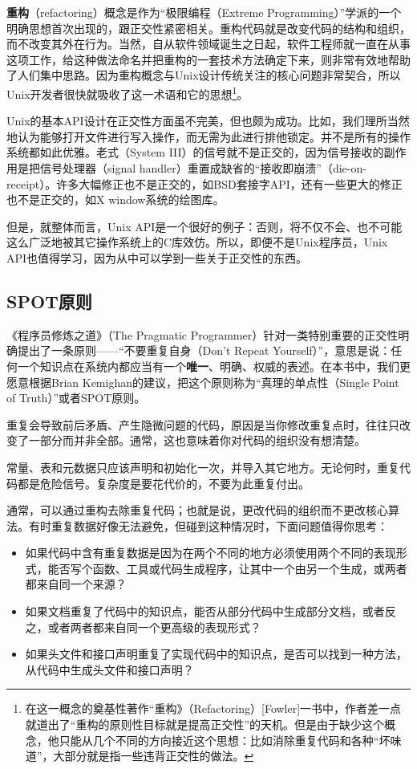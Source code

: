 \documentclass[11pt,oneside]{book}
\begin{document}
\begin{common-format}
\textbf{重构}（refactoring）概念是作为“极限编程（Extreme Programming）”学派的一个明确思想首次出现的，跟正交性紧密相关。重构代码就是改变代码的结构和组织，而不改变其外在行为。当然，自从软件领域诞生之日起，软件工程师就一直在从事这项工作，给这种做法命名并把重构的一套技术方法确定下来，则非常有效地帮助了人们集中思路。因为重构概念与Unix设计传统关注的核心问题非常契合，所以Unix开发者很快就吸收了这一术语和它的思想\footnote{在这一概念的奠基性著作“重构》（Refactoring）[Fowler]一书中，作者差一点就道出了“重构的原则性目标就是提高正交性”的天机。但是由于缺少这个概念，他只能从几个不同的方向接近这个思想：比如消除重复代码和各种“坏味道”，大部分就是指一些违背正交性的做法。}。

Unix的基本API设计在正交性方面虽不完美，但也颇为成功。比如，我们理所当然地认为能够打开文件进行写入操作，而无需为此进行排他锁定。并不是所有的操作系统都如此优雅。老式（System III）的信号就不是正交的，因为信号接收的副作用是把信号处理器（signal handler）重置成缺省的“接收即崩溃”（die-on-receipt）。许多大幅修正也不是正交的，如BSD套接字API，还有一些更大的修正也不是正交的，如X window系统的绘图库。

但是，就整体而言，Unix API是一个很好的例子：否则，将不仅不会、也不可能这么广泛地被其它操作系统上的C库效仿。所以，即便不是Unix程序员，Unix API也值得学习，因为从中可以学到一些关于正交性的东西。


\subsection{SPOT原则}
《程序员修炼之道》（The Pragmatic Programmer）针对一类特别重要的正交性明确提出了一条原则——“不要重复自身（Don't Repeat Yourself）”，意思是说：任何一个知识点在系统内都应当有一个\textbf{唯一}、明确、权威的表述。在本书中，我们更愿意根据Brian Kemighan的建议，把这个原则称为“真理的单点性（Single Point of Truth）”或者SPOT原则。

重复会导致前后矛盾、产生隐微问题的代码，原因是当你修改重复点时，往往只改变了一部分而并非全部。通常，这也意味着你对代码的组织没有想清楚。

常量、表和元数据只应该声明和初始化一次，并导入其它地方。无论何时，重复代码都是危险信号。复杂度是要花代价的，不要为此重复付出。

通常，可以通过重构去除重复代码；也就是说，更改代码的组织而不更改核心算法。有时重复数据好像无法避免，但碰到这种情况时，下面问题值得你思考：

\begin{itemize}
\item 如果代码中含有重复数据是因为在两个不同的地方必须使用两个不同的表现形式，能否写个函数、工具或代码生成程序，让其中一个由另一个生成，或两者都来自同一个来源？
\item 如果文档重复了代码中的知识点，能否从部分代码中生成部分文档，或者反之，或者两者都来自同一个更高级的表现形式？
\item 如果头文件和接口声明重复了实现代码中的知识点，是否可以找到一种方法，从代码中生成头文件和接口声明？
\end{itemize}


\end{common-format}
\end{document}
